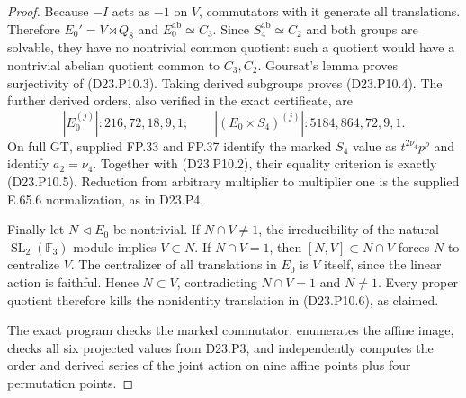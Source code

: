 \begin{proof}
Because $-I$ acts as $-1$ on $V$, commutators with it generate
all translations. Therefore $E_0'=V\rtimes Q_8$ and
$E_0^{\mathrm{ab}}\simeq C_3$. Since
$S_4^{\mathrm{ab}}\simeq C_2$ and both groups are solvable,
they have no nontrivial common quotient: such a quotient would
have a nontrivial abelian quotient common to $C_3,C_2$.
Goursat's lemma proves surjectivity of (D23.P10.3). Taking
derived subgroups proves (D23.P10.4). The further derived orders,
also verified in the exact certificate, are
\[
 |E_0^{(j)}|:216,72,18,9,1;\qquad
 |(E_0\times S_4)^{(j)}|:5184,864,72,9,1.
\]
On full GT, supplied FP.33 and FP.37 identify the marked
$S_4$ value as $t^{2\nu_4}p^\rho$ and identify $a_2=\nu_4$.
Together with (D23.P10.2), their equality criterion is exactly
(D23.P10.5). Reduction from arbitrary multiplier to multiplier
one is the supplied E.65.6 normalization, as in D23.P4.

Finally let $N\lhd E_0$ be nontrivial. If $N\cap V\ne1$,
the irreducibility of the natural $\operatorname{SL}_2(\mathbb F_3)$
module implies $V\subset N$. If $N\cap V=1$, then
$[N,V]\subset N\cap V$ forces $N$ to centralize $V$.
The centralizer of all translations in $E_0$ is $V$ itself,
since the linear action is faithful. Hence $N\subset V$,
contradicting $N\cap V=1$ and $N\ne1$. Every proper quotient
therefore kills the nonidentity translation in (D23.P10.6),
as claimed.

The exact program 
checks the marked commutator, enumerates the affine image,
checks all six projected values from D23.P3, and independently
computes the order and derived series of the joint action on
nine affine points plus four permutation points.
\end{proof}
